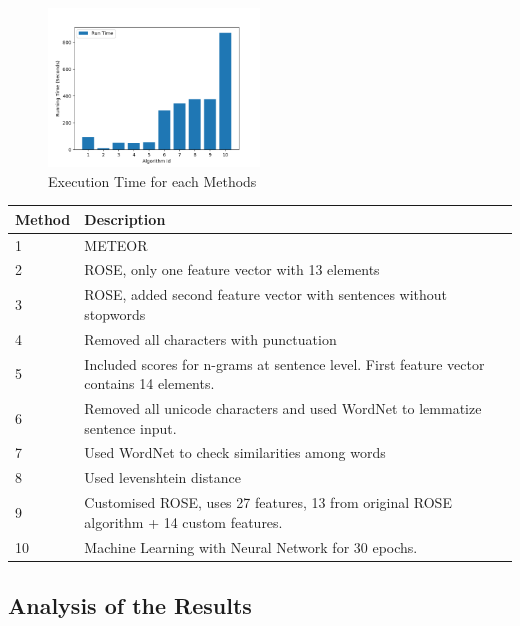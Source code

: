 \documentclass[11pt,letterpaper]{article}
\begin{document}
\begin{figure}
  \caption{Execution Time for each Methods}
    \includegraphics[width=0.5\textwidth]{Figure_2}
\end{figure}


\begin{center}
	\begin{tabular}{| l | p{6cm} |}
	\hline
	Method & Description \\ \hline
	1 & METEOR \\ \hline
	2 & ROSE, only one feature vector with 13 elements \\ \hline
	3 & ROSE, added second feature vector with sentences without stopwords \\ \hline
	4 & Removed all characters with punctuation \\ \hline
	5 & Included scores for n-grams at sentence level. First feature vector contains 14 elements.  \\ \hline
	6 & Removed all unicode characters and used WordNet to lemmatize sentence input. \\ \hline
	7 & Used WordNet to check similarities among words \\ \hline
	8 & Used levenshtein distance \\ \hline
	9 & Customised ROSE, uses 27 features, 13 from original ROSE algorithm + 14 custom features.  \\ \hline
	10 & Machine Learning with Neural Network for 30 epochs.  \\ \hline
	\end{tabular}
\end{center}

\subsection{Analysis of the Results}
\end{document}
